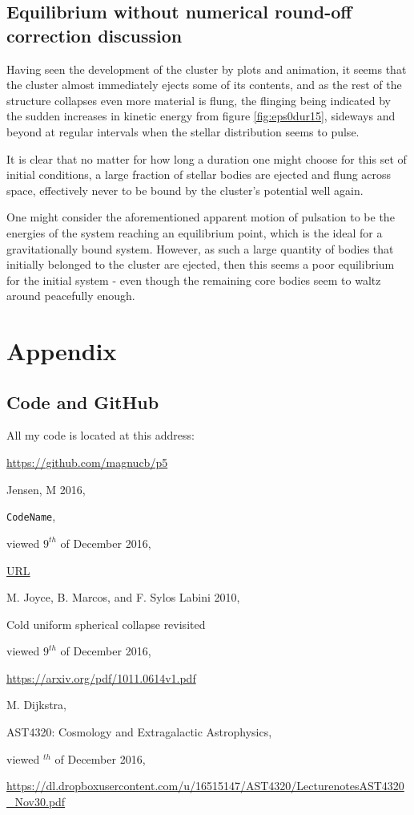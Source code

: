 \documentclass[11pt,a4paper,notitlepage,twocolumn]{article}
\begin{document}
\subsection{Equilibrium without numerical round-off correction discussion}
Having seen the development of the cluster by plots and animation, it seems that the cluster almost immediately ejects some of its contents, and as the rest of the structure collapses even more material is flung, the flinging being indicated by the sudden increases in kinetic energy from figure \ref{fig:eps0dur15}, sideways and beyond at regular intervals when the stellar distribution seems to pulse.

It is clear that no matter for how long a duration one might choose for this set of initial conditions, a large fraction of stellar bodies are ejected and flung across space, effectively never to be bound by the cluster's potential well again.

One might consider the aforementioned apparent motion of pulsation to be the energies of the system reaching an equilibrium point, which is the ideal for a gravitationally bound system. However, as such a large quantity of bodies that initially belonged to the cluster are ejected, then this seems a poor equilibrium for the initial system - even though the remaining core bodies seem to waltz around peacefully enough.






\section{Appendix}
\subsection{Code and GitHub}
All my code is located at this address:

\url{https://github.com/magnucb/p5}

\begin{thebibliography}{9}
  Jensen, M 2016,
  
  \verb|CodeName|,
  
  viewed $9^{th}$ of December 2016,
  
  \url{URL}

	M. Joyce, B. Marcos, and F. Sylos Labini 2010,
	
	Cold uniform spherical collapse revisited
	
	viewed $9^{th}$ of December 2016,
		
	\url{https://arxiv.org/pdf/1011.0614v1.pdf}
	
	M. Dijkstra,
	
	AST4320: Cosmology and Extragalactic Astrophysics,
	
	viewed $^{th}$ of December 2016,
	
	\url{https://dl.dropboxusercontent.com/u/16515147/AST4320/LecturenotesAST4320_Nov30.pdf}
\end{thebibliography}
\end{document}
